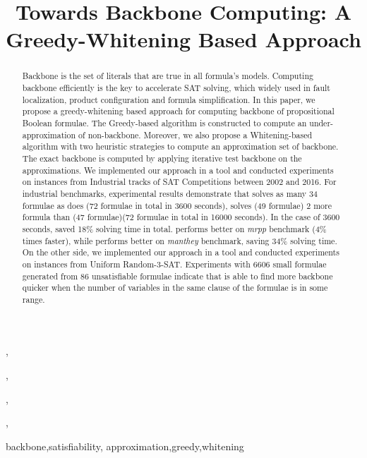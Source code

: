 \documentclass{IOS-Book-Article}
\def\hb{\hbox to 10.7 cm{}}
\begin{document}
\pagestyle{headings}
\def\thepage{}

\begin{frontmatter}              %


\title{Towards Backbone Computing: A Greedy-Whitening Based Approach}

\markboth{}{January 2017\hb}

\author[A]{ 
},
\author[A]{ }
,
\author[A]{ }
,
\author[B]{ }
,
\author[A]{ }

\address[A]{National Research Center of Trustworthy Embedded Software
        \\ East China Normal University, China}
\address[B]{School of Information Science and Technology ShanghaiTech University, China}

\begin{abstract}
Backbone is the set of literals that are true in all formula's models.  Computing  backbone efficiently is the key to  accelerate SAT solving, which widely used in fault localization, product configuration and formula simplification.
In this paper, we propose a greedy-whitening based approach for computing backbone of propositional Boolean formulae.
The Greedy-based algorithm is constructed to compute an under-approximation of non-backbone. Moreover, we also propose 
a Whitening-based algorithm with two heuristic strategies to compute an approximation set of backbone.
The exact backbone is computed by applying iterative test backbone on the approximations.
We implemented our approach in a tool \tool and conducted experiments on instances from Industrial tracks of SAT Competitions
between 2002 and 2016. For industrial benchmarks, experimental results demonstrate that \tool solves as many 34 formulae as \minibones does (72 formulae in total in 3600 seconds), solves (49 formulae)  2 more formula than \minibones(47 formulae)(72 formulae in total in 16000 seconds).   In the case of 3600 seconds, \tool saved 18\% solving time in total.
\minibones performs better on \textit{mrpp} benchmark (4\% times faster), while \tool performs better on \textit{manthey} benchmark, saving 34\% solving time.
On the other side, we implemented our approach in a tool \tool and conducted experiments on instances from Uniform Random-3-SAT. Experiments with 6606 small formulae generated from 86 unsatisfiable formulae indicate that \tool is able to find more backbone quicker  when the number of variables in the same clause of the formulae is in some range.
\end{abstract}

\begin{keyword}
backbone\sep satisfiability\sep
approximation\sep greedy\sep whitening
\end{keyword}
\end{frontmatter}
\markboth{January 2017\hb}{January 2017\hb}
\end{document}

